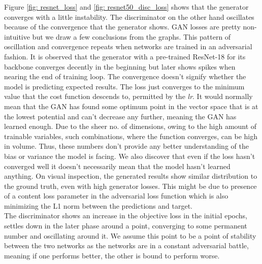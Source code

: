 \documentclass{article} %
\begin{document}
    Figure \ref{fig: resnet_loss} and \ref{fig: resnet50_disc_loss} shows that the generator converges with a little instability. The discriminator on the other hand oscillates because of the convergence that the generator shows. GAN losses are pretty non-intuitive but we draw a few conclusions from the graphs. This pattern of oscillation and convergence repeats when networks are trained in an adversarial fashion. It is observed that the generator with a pre-trained ResNet-18 for its backbone converges decently in the beginning but later shows spikes when nearing the end of training loop. The convergence doesn't signify whether the model is predicting expected results. The loss just converges to the minimum value that the cost function descends to, permitted by the \textit{lr}. It would normally mean that the GAN has found some optimum point in the vector space that is at the lowest potential and can't decrease any further, meaning the GAN has learned enough. Due to the sheer no. of dimensions, owing to the high amount of trainable variables, such combinations, where the function converges, can be high in volume. Thus, these numbers don't provide any better understanding of the bias or variance the model is facing. We also discover that even if the loss hasn't converged well it doesn't necessarily mean that the model hasn't learned anything. On visual inspection, the generated results show similar distribution to the ground truth, even with high generator losses. This might be due to presence of a content loss parameter in the adversarial loss function which is also minimizing the L1 norm between the predictions and target.\\
\hspace*{0.167 in}The discriminator shows an increase in the objective loss in the initial epochs, settles down in the later phase around a point, converging to some permanent number and oscillating around it. We assume this point to be a point of stability between the two networks as the networks are in a constant adversarial battle, meaning if one performs better, the other is bound to perform worse.
\end{document}
